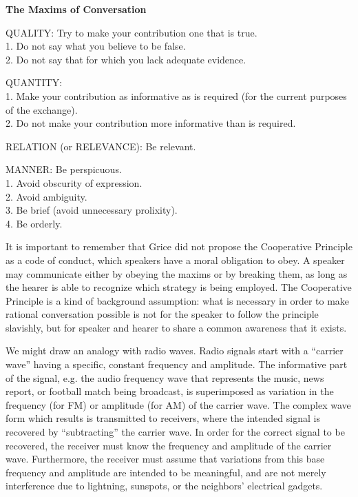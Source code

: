 \begin{stylepoints} \label{ex:8.6}
\textbf{The Maxims of Conversation} \citep[45-46]{Grice1975}

QUALITY: Try to make your contribution one that is true.\\
1. Do not say what you believe to be false.\\
2. Do not say that for which you lack adequate evidence.

QUANTITY:\\
1. Make your contribution as informative as is required (for the current purposes of the exchange).\\
2. Do not make your contribution more informative than is required.

RELATION (or RELEVANCE): Be relevant.
 
MANNER: Be perspicuous.\\
1. Avoid obscurity of expression.\\
2. Avoid ambiguity.\\
3. Be brief (avoid unnecessary prolixity).\\
4. Be orderly.
\end{stylepoints}


It is important to remember that Grice did not propose the Cooperative Principle as a code of conduct, which speakers have a moral obligation to obey. A speaker may communicate either by obeying the maxims or by breaking them, as long as the hearer is able to recognize which strategy is being employed. The Cooperative Principle is a kind of background assumption: what is necessary in order to make rational conversation possible is not for the speaker to follow the principle slavishly, but for speaker and hearer to share a common awareness that it exists.



We might draw an analogy with radio waves. Radio signals start with a “carrier wave” having a specific, constant frequency and amplitude. The informative part of the signal, e.g. the audio frequency wave that represents the music, news report, or football match being broadcast, is superimposed as variation in the frequency (for FM) or amplitude (for AM) of the carrier wave. The complex wave form which results is transmitted to receivers, where the intended signal is recovered by “subtracting” the carrier wave. In order for the correct signal to be recovered, the receiver must know the frequency and amplitude of the carrier wave. Furthermore, the receiver must assume that variations from this base frequency and amplitude are intended to be meaningful, and are not merely interference due to lightning, sunspots, or the neighbors’ electrical gadgets.



